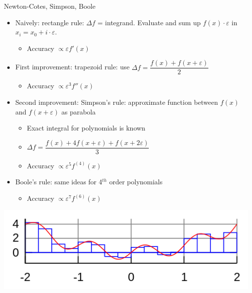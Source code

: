 
\begin{frame}{Newton-Cotes, Simpson, Boole}
%
\begin{minipage}{.6\linewidth}
\small
\begin{itemize}
\item Naively: rectangle rule: $\Delta f$ = integrand. Evaluate and sum up $f(x) \cdot \varepsilon$ in $x_i = x_0 + i \cdot \varepsilon$.
	\vspace{-4pt}
	\begin{itemize}
	\item Accuracy $\propto \varepsilon f'(x)$ 
	\end{itemize}
	\vspace{-9pt}
\item First improvement: trapezoid rule: use $\Delta f = \dfrac{f(x) + f(x + \varepsilon)}{2}$
	\vspace{-4pt}
	\begin{itemize}
	\item Accuracy $\propto \varepsilon^3 f''(x)$ 
	\end{itemize}
	\vspace{-4pt}
\item Second improvement: Simpson's rule: approximate function between $f(x)$ and $f(x + \varepsilon)$ as parabola
	\begin{itemize}
	\item Exact integral for polynomials is known
	\item $\Delta f = \dfrac{f(x) + 4f(x + \varepsilon) + f(x + 2\varepsilon)}{3}$
	\item Accuracy $\propto \varepsilon^5 f^{(4)}(x)$ 
	\end{itemize}
	\vspace{-6pt}
\item Boole's rule: same ideas for 4$^{th}$ order polynomials
	\begin{itemize}
	\item Accuracy $\propto \varepsilon^7 f^{(6)}(x)$ 
	\end{itemize}
\end{itemize}
\end{minipage}
%
\begin{minipage}{.39\linewidth}
\includegraphics[width=\linewidth]{./gfx/06-rule01-rectangle}

\end{minipage}
\end{frame}
